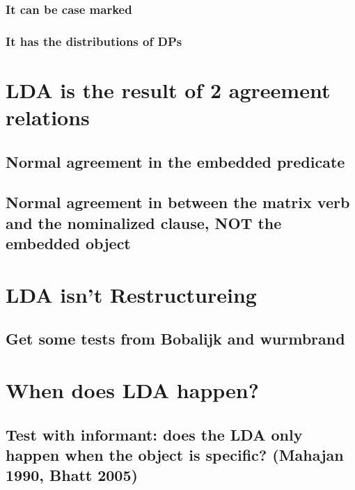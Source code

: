 \documentclass{article}
\begin{document}
\subsubsection{It can be case marked}

\subsubsection{It has the distributions of DPs}

\section{LDA is the result of 2 agreement relations}

\subsection{Normal agreement in the embedded predicate}

\subsection{Normal agreement in between the matrix verb and the nominalized clause, NOT the embedded object}

\section{LDA isn't Restructureing}
\subsection{Get some tests from Bobalijk and wurmbrand}

\section{When does LDA happen?}

\subsection{Test with informant: does the LDA only happen when the object is specific? (Mahajan 1990, Bhatt 2005)}



\appendix
\end{document}
